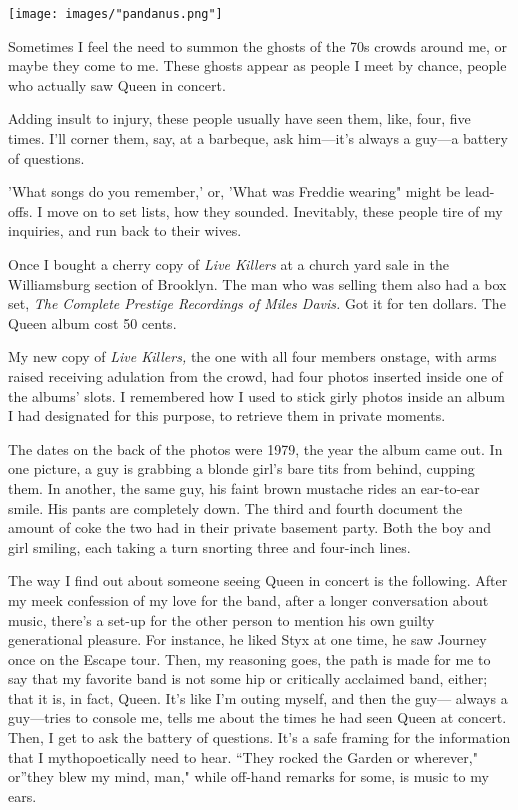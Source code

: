 \documentclass[
]{memoir}
\begin{document}
\begin{center}\texttt{[image: images/"pandanus.png"]}\end{center}

Sometimes I feel the need to summon the ghosts of the 70s crowds around
me, or maybe they come to me. These ghosts appear as people I meet by
chance, people who actually saw Queen in concert.

Adding insult to injury, these people usually have seen them, like,
four, five times. I'll corner them, say, at a barbeque, ask him---it's
always a guy---a battery of questions.

'What songs do you remember,' or, 'What was Freddie wearing" might be
lead-offs. I move on to set lists, how they sounded. Inevitably, these
people tire of my inquiries, and run back to their wives.

Once I bought a cherry copy of \emph{Live Killers} at a church yard sale
in the Williamsburg section of Brooklyn. The man who was selling them
also had a box set, \emph{The Complete Prestige Recordings of Miles
Davis.} Got it for ten dollars. The Queen album cost 50 cents.

My new copy of \emph{Live Killers,} the one with all four members
onstage, with arms raised receiving adulation from the crowd, had four
photos inserted inside one of the albums' slots. I remembered how I used
to stick girly photos inside an album I had designated for this purpose,
to retrieve them in private moments.

The dates on the back of the photos were 1979, the year the album came
out. In one picture, a guy is grabbing a blonde girl's bare tits from
behind, cupping them. In another, the same guy, his faint brown mustache
rides an ear-to-ear smile. His pants are completely down. The third and
fourth document the amount of coke the two had in their private basement
party. Both the boy and girl smiling, each taking a turn snorting three
and four-inch lines.

The way I find out about someone seeing Queen in concert is the
following. After my meek confession of my love for the band, after a
longer conversation about music, there's a set-up for the other person
to mention his own guilty generational pleasure. For instance, he liked
Styx at one time, he saw Journey once on the Escape tour. Then, my
reasoning goes, the path is made for me to say that my favorite band is
not some hip or critically acclaimed band, either; that it is, in fact,
Queen. It's like I'm outing myself, and then the guy--- always a
guy---tries to console me, tells me about the times he had seen Queen at
concert. Then, I get to ask the battery of questions. It's a safe
framing for the information that I mythopoetically need to hear. ``They
rocked the Garden or wherever," or''they blew my mind, man," while
off-hand remarks for some, is music to my ears.
\end{document}
